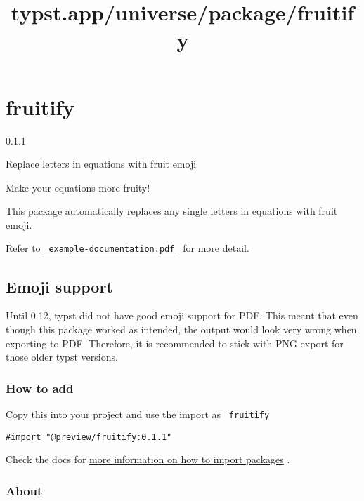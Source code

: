 \title{typst.app/universe/package/fruitify}

\label{banner}
\section{fruitify}\label{fruitify}

{ 0.1.1 }

Replace letters in equations with fruit emoji

\label{readme}
Make your equations more fruity!

This package automatically replaces any single letters in equations with
fruit emoji.

Refer to
\href{https://codeberg.org/T0mstone/typst-fruitify/src/tag/0.1.1/example-documentation.pdf}{\texttt{\ example-documentation.pdf\ }}
for more detail.

\subsection{Emoji support}\label{emoji-support}

Until 0.12, typst did not have good emoji support for PDF. This meant
that even though this package worked as intended, the output would look
very wrong when exporting to PDF. Therefore, it is recommended to stick
with PNG export for those older typst versions.

\subsubsection{How to add}\label{how-to-add}

Copy this into your project and use the import as \texttt{\ fruitify\ }

\begin{verbatim}
#import "@preview/fruitify:0.1.1"
\end{verbatim}



Check the docs for
\href{https://typst.app/docs/reference/scripting/\#packages}{more
information on how to import packages} .

\subsubsection{About}\label{about}


